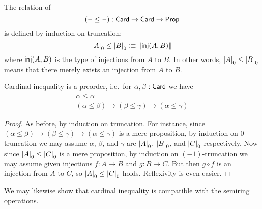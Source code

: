 \begin{defn}
  The relation of 
  \[ (\mathord{\hspace{1pt}\text{--}\hspace{1pt}}\le\mathord{\hspace{1pt}\text{--}\hspace{1pt}}) : \mathsf{Card}\to\mathsf{Card}\to\mathsf{Prop} \]
  is defined by induction on truncation:
  \[ \mathopen{}\left|A\right|_{0}^{}\mathclose{} \le \mathopen{}\left|B\right|_{0}^{}\mathclose{} \vcentcolon\equiv \mathopen{}\left\Vert \mathsf{inj}(A,B)\right\Vert_{}\mathclose{} \]
  where $\mathsf{inj}(A,B)$ is the type of injections from $A$ to $B$.
  In other words, $\mathopen{}\left|A\right|_{0}^{}\mathclose{} \le \mathopen{}\left|B\right|_{0}^{}\mathclose{}$ means that there merely exists an injection from $A$ to $B$.
\end{defn}

\begin{lem}
  Cardinal inequality is a preorder, i.e.\ for $\alpha,\beta:\mathsf{Card}$ we have
  \begin{gather*}
    \alpha \le \alpha\\
    (\alpha \le \beta) \to (\beta\le\gamma) \to (\alpha\le\gamma)
  \end{gather*}
\end{lem}
\begin{proof}
  As before, by induction on truncation.
  For instance, since $(\alpha \le \beta) \to (\beta\le\gamma) \to (\alpha\le\gamma)$ is a mere proposition, by induction on 0-truncation we may assume $\alpha$, $\beta$, and $\gamma$ are $\mathopen{}\left|A\right|_{0}^{}\mathclose{}$, $\mathopen{}\left|B\right|_{0}^{}\mathclose{}$, and $\mathopen{}\left|C\right|_{0}^{}\mathclose{}$ respectively.
  Now since $\mathopen{}\left|A\right|_{0}^{}\mathclose{} \le \mathopen{}\left|C\right|_{0}^{}\mathclose{}$ is a mere proposition, by induction on $(-1)$-truncation we may assume given injections $f:A\to B$ and $g:B\to C$.
  But then $g\circ f$ is an injection from $A$ to $C$, so $\mathopen{}\left|A\right|_{0}^{}\mathclose{} \le \mathopen{}\left|C\right|_{0}^{}\mathclose{}$ holds.
  Reflexivity is even easier.
\end{proof}

We may likewise show that cardinal inequality is compatible with the semiring operations.

